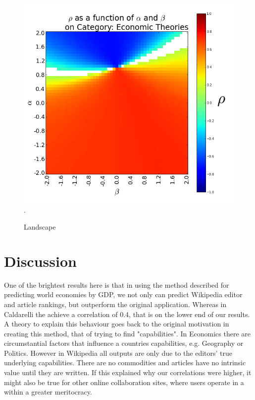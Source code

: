 \documentclass{acm_proc_article-sp}
\begin{document}
\begin{figure}[!t]
\centering
\includegraphics[width=0.9\columnwidth]{landscape.png}.
\caption{Landscape}
\label{fig:landscape}
\end{figure}




\section{Discussion}

One of the brightest results here is that in using the method described for predicting world economies by GDP, we not only can predict Wikipedia editor and article rankings, but outperform the original application. Whereas in Caldarelli the achieve a correlation of 0.4, \cite{Caldarelli} that is on the lower end of our results. A theory to explain this behaviour goes back to the original motivation in creating this method, that of trying to find "capabilities". In Economics there are circumstantial factors that influence a countries capabilities, e.g. Geography or Politics. However in Wikipedia all outputs are only due to the editors' true underlying capabilities. There are no commodities and articles have no intrinsic value until they are written. If this explained why our correlations were higher, it might also be true for other online collaboration sites, where users operate in a within a greater meritocracy.
\end{document}

